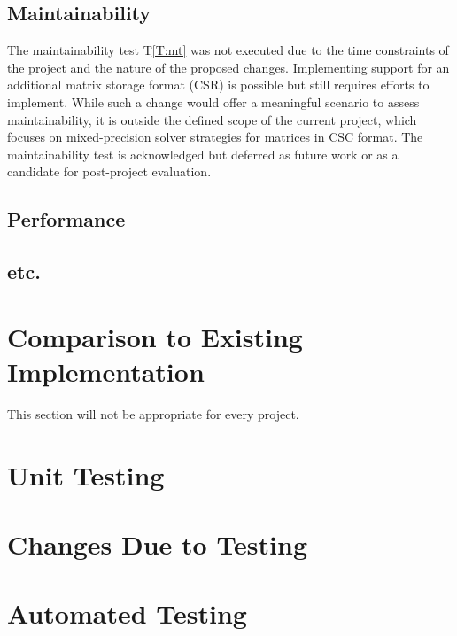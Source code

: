 \documentclass[12pt, titlepage]{article}
\newcommand{\tref}[1]{T\ref{#1}}
\begin{document}
\subsection{Maintainability}

The maintainability test \tref{T:mt} was not executed due to the time
constraints of the project and the nature of the proposed changes. Implementing
support for an additional matrix storage format (CSR) is possible but still
requires efforts to implement. While such a change would offer a meaningful
scenario to assess maintainability, it is outside the defined scope of the
current project, which focuses on mixed-precision solver strategies for matrices
in CSC format. The maintainability test is acknowledged but deferred as future
work or as a candidate for post-project evaluation.

\subsection{Performance}

\subsection{etc.}

\section{Comparison to Existing Implementation}

This section will not be appropriate for every project.

\section{Unit Testing}

\section{Changes Due to Testing}


\section{Automated Testing}
\end{document}
